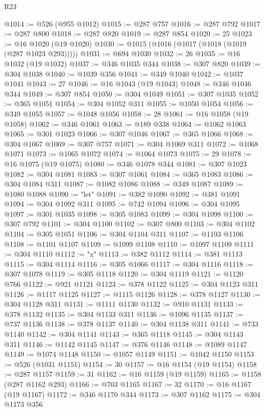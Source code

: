 \begin{lexlean}{R23}
\begin{coremodule}
@1014 := @526 (@955 @1012)
@1015 := @287 @757
@1016 := @287 @792
@1017 := @287 @800
@1018 := @287 @820
@1019 := @287 @854
@1020 := 25
@1023 := @16 @1020 (@19 @1020)
@1030 := @1015 (@1016 (@1017 (@1018 (@1019 (@287 @1023 @293)))))
@1031 := @694 @1030
@1032 := 26
@1035 := @16 @1032 (@19 @1032)
@1037 := @346 @1035 @344
@1038 := @307 @820
@1039 := @304 @1038
@1040 := @1039 @356
@1041 := @349 @1040
@1042 := @1037 @1041
@1043 := 27
@1046 := @16 @1043 (@19 @1043)
@1048 := @346 @1046 @344
@1049 := @307 @854
@1050 := @304 @1049
@1051 := @307 @1035
@1052 := @365 @1051
@1054 := @304 @1052 @311
@1055 := @1050 @1054
@1056 := @349 @1055
@1057 := @1048 @1056
@1058 := 28
@1061 := @16 @1058 (@19 @1058)
@1062 := @346 @1061
@1063 := @189 @338
@1064 := @1062 @1063
@1065 := @301 @1023
@1066 := @307 @1046
@1067 := @365 @1066
@1068 := @304 @1067
@1069 := @307 @757
@1071 := @304 @1069 @311
@1072 := @1068 @1071
@1073 := @1065 @1072
@1074 := @1064 @1073
@1075 := 29
@1078 := @16 @1075 (@19 @1075)
@1080 := @346 @1078 @344
@1081 := @307 @1023
@1082 := @304 @1081
@1083 := @307 @1061
@1084 := @365 @1083
@1086 := @304 @1084 @311
@1087 := @1082 @1086
@1088 := @349 @1087
@1089 := @1080 @1088
@1090 := "let"
@1091 := @382 @1090
@1092 := @381 @1091
@1094 := @304 @1092 @311
@1095 := @742 @1094
@1096 := @304 @1095
@1097 := @301 @1035
@1098 := @305 @1083
@1099 := @304 @1098
@1100 := @307 @792
@1101 := @304 @1100
@1102 := @307 @800
@1103 := @304 @1102
@1104 := @305 @1051
@1106 := @304 @1104 @311
@1107 := @1103 @1106
@1108 := @1101 @1107
@1109 := @1099 @1108
@1110 := @1097 @1109
@1111 := @304 @1110
@1112 := "x"
@1113 := @382 @1112
@1114 := @381 @1113
@1115 := @304 @1114
@1116 := @305 @1066
@1117 := @304 @1116
@1118 := @307 @1078
@1119 := @305 @1118
@1120 := @304 @1119
@1121 := @1120 @766
@1122 := @921 @1121
@1123 := @378 @1122
@1125 := @304 @1123 @311
@1126 := @1117 @1125
@1127 := @1115 @1126
@1128 := @378 @1127
@1130 := @304 @1128 @311
@1131 := @1111 @1130
@1132 := @910 @1131
@1133 := @378 @1132
@1135 := @304 @1133 @311
@1136 := @1096 @1135
@1137 := @737 @1136
@1138 := @378 @1137
@1140 := @304 @1138 @311
@1141 := @733 @1140
@1142 := @304 @1141
@1143 := @365 @1118
@1145 := @304 @1143 @311
@1146 := @1142 @1145
@1147 := @376 @1146
@1148 := @1089 @1147
@1149 := @1074 @1148
@1150 := @1057 @1149
@1151 := @1042 @1150
@1153 := @526 (@1031 @1151)
@1154 := 30
@1157 := @16 @1154 (@19 @1154)
@1158 := @287 @1157
@1159 := 31
@1162 := @16 @1159 (@19 @1159)
@1165 := @1158 (@287 @1162 @293)
@1166 := @703 @1165
@1167 := 32
@1170 := @16 @1167 (@19 @1167)
@1172 := @346 @1170 @344
@1173 := @307 @1162
@1175 := @304 @1173 @356

\end{coremodule}
\end{lexlean}

